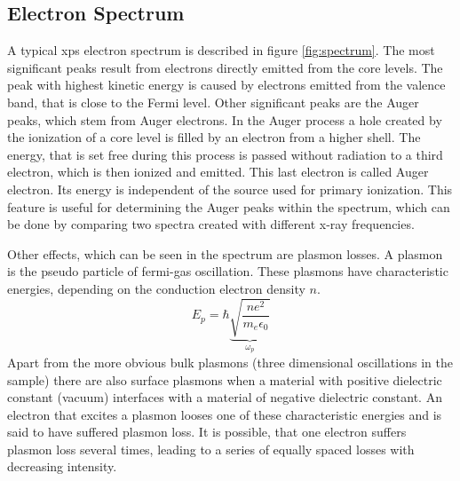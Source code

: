 \documentclass[a4paper]{scrartcl}
\numberwithin{equation}{section}
\numberwithin{figure}{section}
\numberwithin{table}{section}
\begin{document}
\subsection{Electron Spectrum}
A typical xps electron spectrum is described in figure \ref{fig:spectrum}. The most significant peaks result from electrons directly emitted from the core levels. The peak with highest kinetic energy is caused by electrons emitted from the valence band, that is close to the Fermi level. Other significant peaks are the Auger peaks, which stem from Auger electrons. In the Auger process a hole created by the ionization of a core level is filled by an electron from a higher shell. The energy, that is set free during this process is passed without radiation to a third electron, which is then ionized and emitted. This last electron is called Auger electron. Its energy is independent of the source used for primary ionization. This feature is useful for determining the Auger peaks within the spectrum, which can be done by comparing two spectra created with different x-ray frequencies.

Other effects, which can be seen in the spectrum are plasmon losses. A plasmon is the pseudo particle of fermi-gas oscillation. These plasmons have characteristic energies, depending on the conduction electron density $n$. 
$$E_p = \hbar \underbrace{\sqrt{\frac{ne^2}{m_e \epsilon_0}}}_{\omega_p}$$
Apart from the more obvious bulk plasmons (three dimensional oscillations in the sample) there are also surface plasmons when a material with positive dielectric constant (vacuum) interfaces with a material of negative dielectric constant. An electron that excites a plasmon looses one of these characteristic energies and is said to have suffered plasmon loss. It is possible, that one electron suffers plasmon loss several times, leading to a series of equally spaced losses with decreasing intensity.
\end{document}
